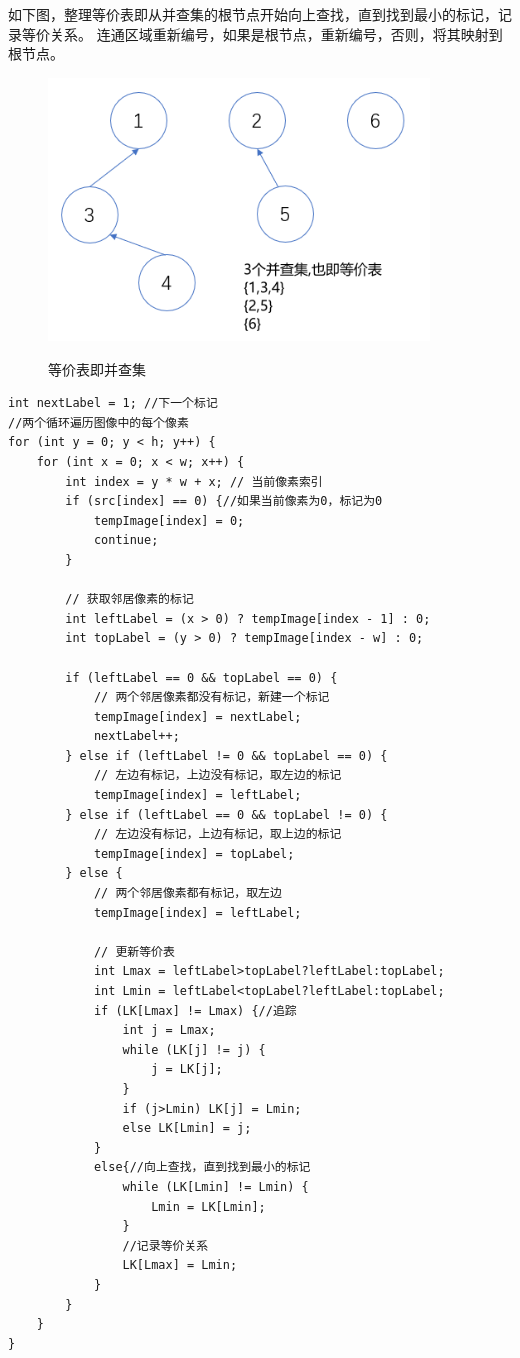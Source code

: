 \documentclass[12pt,hyperref,a4paper,UTF8]{ctexart}
\begin{document}
如下图，整理等价表即从并查集的根节点开始向上查找，直到找到最小的标记，记录等价关系。
连通区域重新编号，如果是根节点，重新编号，否则，将其映射到根节点。        
\begin{figure}[H]
    \centering
    \caption{等价表即并查集}
    \includegraphics[width=0.9\textwidth]{./figures/fig/image6.png}
    \label{fig:your_image_label}
\end{figure}
        \begin{lstlisting}[caption={遍历数组，连通域临时标号}, label={lst:example}]
int nextLabel = 1; //下一个标记
//两个循环遍历图像中的每个像素
for (int y = 0; y < h; y++) {
    for (int x = 0; x < w; x++) {
        int index = y * w + x; // 当前像素索引
        if (src[index] == 0) {//如果当前像素为0，标记为0
            tempImage[index] = 0;
            continue;
        }

        // 获取邻居像素的标记
        int leftLabel = (x > 0) ? tempImage[index - 1] : 0;
        int topLabel = (y > 0) ? tempImage[index - w] : 0;

        if (leftLabel == 0 && topLabel == 0) {
            // 两个邻居像素都没有标记，新建一个标记
            tempImage[index] = nextLabel;
            nextLabel++;
        } else if (leftLabel != 0 && topLabel == 0) {
            // 左边有标记，上边没有标记，取左边的标记
            tempImage[index] = leftLabel;
        } else if (leftLabel == 0 && topLabel != 0) {
            // 左边没有标记，上边有标记，取上边的标记
            tempImage[index] = topLabel;
        } else {
            // 两个邻居像素都有标记，取左边
            tempImage[index] = leftLabel;

            // 更新等价表
            int Lmax = leftLabel>topLabel?leftLabel:topLabel;
            int Lmin = leftLabel<topLabel?leftLabel:topLabel;
            if (LK[Lmax] != Lmax) {//追踪
                int j = Lmax;
                while (LK[j] != j) {
                    j = LK[j];
                }
                if (j>Lmin) LK[j] = Lmin;
                else LK[Lmin] = j;
            }
            else{//向上查找，直到找到最小的标记
                while (LK[Lmin] != Lmin) {
                    Lmin = LK[Lmin];
                }
                //记录等价关系
                LK[Lmax] = Lmin;
            }
        }
    }
}
        \end{lstlisting}
\end{document}
